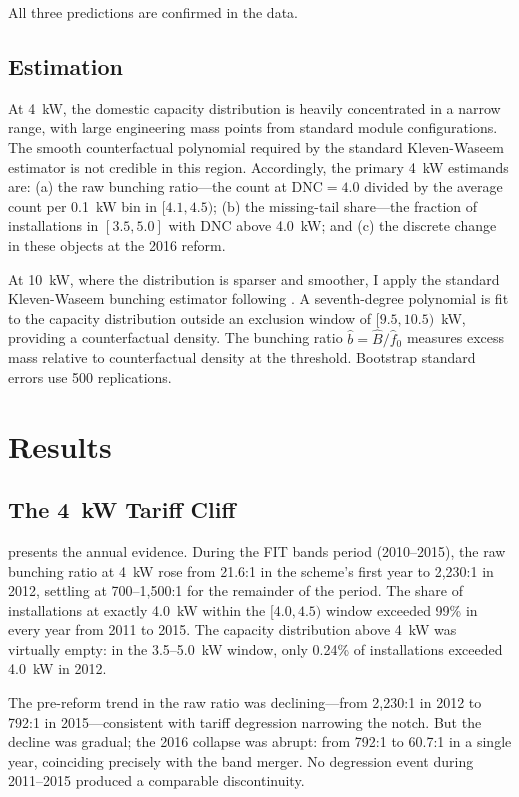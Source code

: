 \documentclass[12pt]{article}
\begin{document}
All three predictions are confirmed in the data.

\subsection{Estimation}

At 4~kW, the domestic capacity distribution is heavily concentrated in a narrow range, with large engineering mass points from standard module configurations. The smooth counterfactual polynomial required by the standard Kleven-Waseem estimator is not credible in this region. Accordingly, the primary 4~kW estimands are: (a) the raw bunching ratio---the count at DNC${}=4.0$ divided by the average count per 0.1~kW bin in $[4.1, 4.5)$; (b) the missing-tail share---the fraction of installations in $[3.5, 5.0]$ with DNC above 4.0~kW; and (c) the discrete change in these objects at the 2016 reform.

At 10~kW, where the distribution is sparser and smoother, I apply the standard Kleven-Waseem bunching estimator following \citet{kleven2013using}. A seventh-degree polynomial is fit to the capacity distribution outside an exclusion window of $[9.5, 10.5)$~kW, providing a counterfactual density. The bunching ratio $\hat{b} = \hat{B}/\hat{f}_0$ measures excess mass relative to counterfactual density at the threshold. Bootstrap standard errors use 500 replications.


\section{Results}
\label{sec:results}

\subsection{The 4~kW Tariff Cliff}

 presents the annual evidence. During the FIT bands period (2010--2015), the raw bunching ratio at 4~kW rose from 21.6:1 in the scheme's first year to 2,230:1 in 2012, settling at 700--1,500:1 for the remainder of the period. The share of installations at exactly 4.0~kW within the $[4.0, 4.5)$ window exceeded 99\% in every year from 2011 to 2015. The capacity distribution above 4~kW was virtually empty: in the 3.5--5.0~kW window, only 0.24\% of installations exceeded 4.0~kW in 2012.

The pre-reform trend in the raw ratio was declining---from 2,230:1 in 2012 to 792:1 in 2015---consistent with tariff degression narrowing the notch. But the decline was gradual; the 2016 collapse was abrupt: from 792:1 to 60.7:1 in a single year, coinciding precisely with the band merger. No degression event during 2011--2015 produced a comparable discontinuity.
\end{document}
